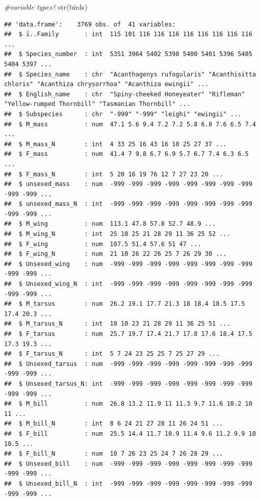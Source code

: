 \documentclass[
  12pt,
]{article}
\newenvironment{Shaded}{\begin{snugshade}}{\end{snugshade}}
\newcommand{\CommentTok}[1]{\textcolor[rgb]{0.56,0.35,0.01}{\textit{#1}}}
\newcommand{\FunctionTok}[1]{\textcolor[rgb]{0.00,0.00,0.00}{#1}}
\newcommand{\NormalTok}[1]{#1}
\begin{document}
\begin{Shaded}
\begin{Highlighting}[]
\CommentTok{\#variable types?}
\FunctionTok{str}\NormalTok{(birds)}
\end{Highlighting}
\end{Shaded}

\begin{verbatim}
## 'data.frame':    3769 obs. of  41 variables:
##  $ ï..Family       : int  115 101 116 116 116 116 116 116 116 116 ...
##  $ Species_number  : int  5351 3964 5402 5398 5400 5401 5396 5405 5404 5397 ...
##  $ Species_name    : chr  "Acanthagenys rufogularis" "Acanthisitta chloris" "Acanthiza chrysorrhoa" "Acanthiza ewingii" ...
##  $ English_name    : chr  "Spiny-cheeked Honeyeater" "Rifleman" "Yellow-rumped Thornbill" "Tasmanian Thornbill" ...
##  $ Subspecies      : chr  "-999" "-999" "leighi" "ewingii" ...
##  $ M_mass          : num  47.1 5.6 9.4 7.2 7.2 5.8 6.8 7.6 6.5 7.4 ...
##  $ M_mass_N        : int  4 33 25 16 43 16 10 25 27 37 ...
##  $ F_mass          : num  41.4 7 9.8 6.7 6.9 5.7 6.7 7.4 6.3 6.5 ...
##  $ F_mass_N        : int  5 20 16 19 76 12 7 27 23 20 ...
##  $ unsexed_mass    : num  -999 -999 -999 -999 -999 -999 -999 -999 -999 -999 ...
##  $ unsexed_mass_N  : int  -999 -999 -999 -999 -999 -999 -999 -999 -999 -999 ...
##  $ M_wing          : num  113.1 47.8 57.8 52.7 48.9 ...
##  $ M_wing_N        : int  25 10 25 21 28 29 11 36 25 52 ...
##  $ F_wing          : num  107.5 51.4 57.6 51 47 ...
##  $ F_wing_N        : num  21 10 26 22 26 25 7 26 29 30 ...
##  $ Unsexed_wing    : num  -999 -999 -999 -999 -999 -999 -999 -999 -999 -999 ...
##  $ Unsexed_wing_N  : int  -999 -999 -999 -999 -999 -999 -999 -999 -999 -999 ...
##  $ M_tarsus        : num  26.2 19.1 17.7 21.3 18 18.4 18.5 17.5 17.4 20.3 ...
##  $ M_tarsus_N      : int  10 10 23 21 28 29 11 36 25 51 ...
##  $ F_tarsus        : num  25.7 19.7 17.4 21.7 17.8 17.6 18.4 17.5 17.3 19.3 ...
##  $ F_tarsus_N      : int  5 7 24 23 25 25 7 25 27 29 ...
##  $ Unsexed_tarsus  : num  -999 -999 -999 -999 -999 -999 -999 -999 -999 -999 ...
##  $ Unsexed_tarsus_N: int  -999 -999 -999 -999 -999 -999 -999 -999 -999 -999 ...
##  $ M_bill          : num  26.8 13.2 11.9 11 11.3 9.7 11.6 10.2 10 11 ...
##  $ M_bill_N        : int  8 6 24 21 27 28 11 26 24 51 ...
##  $ F_bill          : num  25.5 14.4 11.7 10.9 11.4 9.6 11.2 9.9 10 10.5 ...
##  $ F_bill_N        : num  10 7 26 23 25 24 7 26 28 29 ...
##  $ Unsexed_bill    : num  -999 -999 -999 -999 -999 -999 -999 -999 -999 -999 ...
##  $ Unsexed_bill_N  : int  -999 -999 -999 -999 -999 -999 -999 -999 -999 -999 ...

\end{verbatim}
\end{document}
